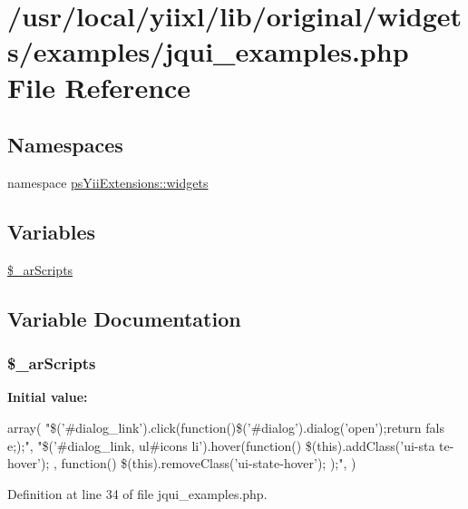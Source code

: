 \hypertarget{jqui__examples_8php}{
\section{/usr/local/yiixl/lib/original/widgets/examples/jqui\_\-examples.php File Reference}
\label{jqui__examples_8php}
}
\subsection*{Namespaces}
\begin{DoxyCompactItemize}
\item 
namespace \hyperlink{namespacepsYiiExtensions_1_1widgets}{psYiiExtensions::widgets}
\end{DoxyCompactItemize}
\subsection*{Variables}
\begin{DoxyCompactItemize}
\item 
\hyperlink{jqui__examples_8php_aa1b183327b8d7bd6a2048a63918017a5}{\$\_\-arScripts}
\end{DoxyCompactItemize}


\subsection{Variable Documentation}
\hypertarget{jqui__examples_8php_aa1b183327b8d7bd6a2048a63918017a5}{
\subsubsection[{\$\_\-arScripts}]{\setlength{\rightskip}{0pt plus 5cm}\$\_\-arScripts}}
\label{jqui__examples_8php_aa1b183327b8d7bd6a2048a63918017a5}
{\bfseries Initial value:}
\begin{DoxyCode}
 array( 
    "\$('#dialog_link').click(function(){\$('#dialog').dialog('open');return fals
      e;});",
    "\$('#dialog_link, ul#icons li').hover(function() { \$(this).addClass('ui-sta
      te-hover'); }, function() { \$(this).removeClass('ui-state-hover'); });",
)
\end{DoxyCode}


Definition at line 34 of file jqui\_\-examples.php.

